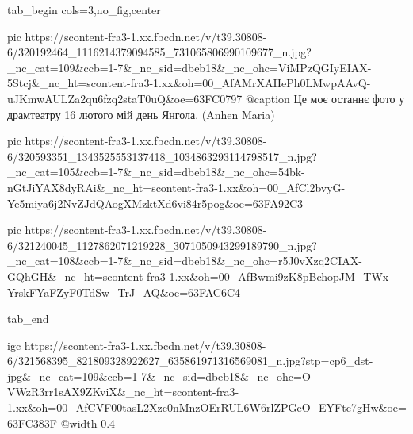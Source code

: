  
 
 
 
 

\begin{center}
\begin{minipage}{\textwidth}

\ifcmt
  tab_begin cols=3,no_fig,center

     pic https://scontent-fra3-1.xx.fbcdn.net/v/t39.30808-6/320192464_1116214379094585_731065806990109677_n.jpg?_nc_cat=109&ccb=1-7&_nc_sid=dbeb18&_nc_ohc=ViMPzQGIyEIAX-5Stcj&_nc_ht=scontent-fra3-1.xx&oh=00_AfAMrXAHePh0LMwpAAvQ-uJKmwAULZa2qu6fzq2staT0uQ&oe=63FC0797
     @caption Це моє останнє фото у драмтеатру 16 лютого мій день Янгола. (Anhen Maria)

     pic https://scontent-fra3-1.xx.fbcdn.net/v/t39.30808-6/320593351_1343525553137418_1034863293114798517_n.jpg?_nc_cat=105&ccb=1-7&_nc_sid=dbeb18&_nc_ohc=54bk-nGtJiYAX8dyRAi&_nc_ht=scontent-fra3-1.xx&oh=00_AfCl2bvyG-Ye5miya6j2NvZJdQAogXMzktXd6vi84r5pog&oe=63FA92C3

     pic https://scontent-fra3-1.xx.fbcdn.net/v/t39.30808-6/321240045_1127862071219228_3071050943299189790_n.jpg?_nc_cat=108&ccb=1-7&_nc_sid=dbeb18&_nc_ohc=r5J0vXzq2CIAX-GQhGH&_nc_ht=scontent-fra3-1.xx&oh=00_AfBwmi9zK8pBchopJM_TWx-YrskFYaFZyF0TdSw_TrJ_AQ&oe=63FAC6C4

  tab_end
\fi

\end{minipage}
\end{center}


\ifcmt
  igc https://scontent-fra3-1.xx.fbcdn.net/v/t39.30808-6/321568395_821809328922627_635861971316569081_n.jpg?stp=cp6_dst-jpg&_nc_cat=109&ccb=1-7&_nc_sid=dbeb18&_nc_ohc=O-VWzR3rr1sAX9ZKviX&_nc_ht=scontent-fra3-1.xx&oh=00_AfCVF00tasL2Xzc0nMnzOErRUL6W6rlZPGeO_EYFtc7gHw&oe=63FC383F
  @width 0.4
\fi

